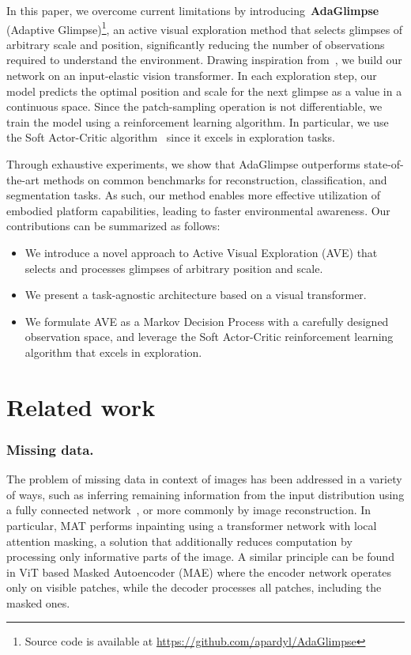 \documentclass[runningheads]{llncs}
\newcommand{\ours}[0]{AdaGlimpse}
\begin{document}
In this paper, we overcome current limitations by introducing~\textbf{\ours{}} (Adaptive Glimpse)\footnote{Source code is available at \url{https://github.com/apardyl/AdaGlimpse}}, %
an active visual exploration method that selects glimpses of arbitrary scale and position, significantly reducing the number of observations required to understand the environment. Drawing inspiration from~\cite{pardyl2023beyond}, we build our network on an input-elastic vision transformer. In each exploration step, our model predicts the optimal position and scale for the next glimpse as a value in a continuous space. Since the patch-sampling operation is not differentiable, we train the model using a reinforcement learning algorithm. In particular, we use the Soft Actor-Critic algorithm~\cite{haarnoja2018soft} since it excels in exploration tasks.


Through exhaustive experiments, we show that \ours{}  outperforms state-of-the-art methods on common benchmarks for reconstruction, classification, and segmentation tasks. As such, our method enables more effective utilization of embodied platform capabilities, leading to faster environmental awareness. Our contributions can be summarized as follows:
\begin{itemize}
\item We introduce a novel approach to Active Visual Exploration (AVE) that selects and processes glimpses of arbitrary position and scale.
\item We present a task-agnostic architecture based on a visual transformer.
\item We formulate AVE as a Markov Decision Process with a carefully designed observation space, and leverage the Soft Actor-Critic reinforcement learning algorithm that excels in exploration.
\end{itemize}


\section{Related work}

\subsubsection{Missing data.}
The problem of missing data in context of images has been addressed in a variety of ways, such as inferring remaining information from the input distribution using a fully connected network~\cite{smieja2018processing}, or more commonly by image reconstruction. 
In particular, MAT\cite{li2022mat} performs inpainting using a transformer network with local attention masking, a solution that additionally reduces computation by processing only informative parts of the image. 
A similar principle can be found in ViT based Masked Autoencoder (MAE)\cite{he2022masked} where the encoder network operates only on visible patches, while the decoder processes all patches, including the masked ones.
\end{document}
